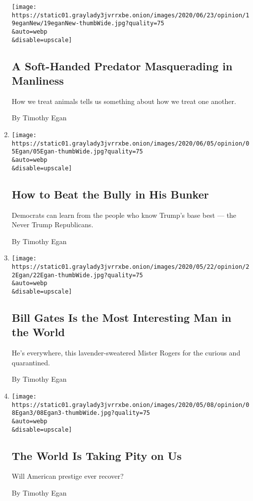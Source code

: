 \begin{enumerate}
  \texttt{[image: https://static01.graylady3jvrrxbe.onion/images/2020/06/23/opinion/19eganNew/19eganNew-thumbWide.jpg?quality=75\\\&auto=webp\\\&disable=upscale]}

  \hypertarget{a-soft-handed-predator-masquerading-in-manliness}{%
  \subsection{A Soft-Handed Predator Masquerading in
  Manliness}\label{a-soft-handed-predator-masquerading-in-manliness}}

  How we treat animals tells us something about how we treat one
  another.

  By Timothy Egan
\item
  \href{/2020/06/05/opinion/republicans-lincoln-project-trump.html}{}

  \texttt{[image: https://static01.graylady3jvrrxbe.onion/images/2020/06/05/opinion/05Egan/05Egan-thumbWide.jpg?quality=75\\\&auto=webp\\\&disable=upscale]}

  \hypertarget{how-to-beat-the-bully-in-his-bunker}{%
  \subsection{How to Beat the Bully in His
  Bunker}\label{how-to-beat-the-bully-in-his-bunker}}

  Democrats can learn from the people who know Trump's base best --- the
  Never Trump Republicans.

  By Timothy Egan
\item
  \href{/2020/05/22/opinion/bill-gates-coronavirus.html}{}

  \texttt{[image: https://static01.graylady3jvrrxbe.onion/images/2020/05/22/opinion/22Egan/22Egan-thumbWide.jpg?quality=75\\\&auto=webp\\\&disable=upscale]}

  \hypertarget{bill-gates-is-the-most-interesting-man-in-the-world}{%
  \subsection{Bill Gates Is the Most Interesting Man in the
  World}\label{bill-gates-is-the-most-interesting-man-in-the-world}}

  He's everywhere, this lavender-sweatered Mister Rogers for the curious
  and quarantined.

  By Timothy Egan
\item
  \href{/2020/05/08/opinion/coronavirus-trump.html}{}

  \texttt{[image: https://static01.graylady3jvrrxbe.onion/images/2020/05/08/opinion/08Egan3/08Egan3-thumbWide.jpg?quality=75\\\&auto=webp\\\&disable=upscale]}

  \hypertarget{the-world-is-taking-pity-on-us}{%
  \subsection{The World Is Taking Pity on
  Us}\label{the-world-is-taking-pity-on-us}}

  Will American prestige ever recover?

  By Timothy Egan
\end{enumerate}

